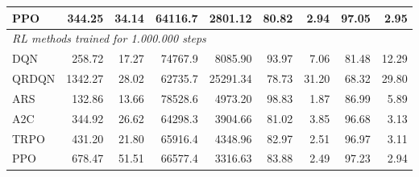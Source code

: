 \begin{samepage}
\begin{center}
\begin{tabular}{l|rr|rr|rr|rr}
    PPO          &   344.25 &    34.14 &    64116.7 &    2801.12 &   80.82 &    2.94 &   97.05 &    2.95 \\
    \midrule
    \multicolumn{9}{l}{\textit{RL methods trained for 1.000.000 steps}} \\
    \midrule
    DQN          &   258.72 &    17.27 &    74767.9 &    8085.90 &   93.97 &    7.06 &   81.48 &   12.29 \\
    QRDQN        &  1342.27 &    28.02 &    62735.7 &   25291.34 &   78.73 &   31.20 &   68.32 &   29.80 \\
    ARS          &   132.86 &    13.66 &    78528.6 &    4973.20 &   98.83 &    1.87 &   86.99 &    5.89 \\
    A2C          &   344.92 &    26.62 &    64298.3 &    3904.66 &   81.02 &    3.85 &   96.68 &    3.13 \\
    TRPO         &   431.20 &    21.80 &    65916.4 &    4348.96 &   82.97 &    2.51 &   96.97 &    3.11 \\
    PPO          &   678.47 &    51.51 &    66577.4 &    3316.63 &   83.88 &    2.49 &   97.23 &    2.94 \\
    \bottomrule
  \end{tabular}
\end{center}
\end{samepage}

